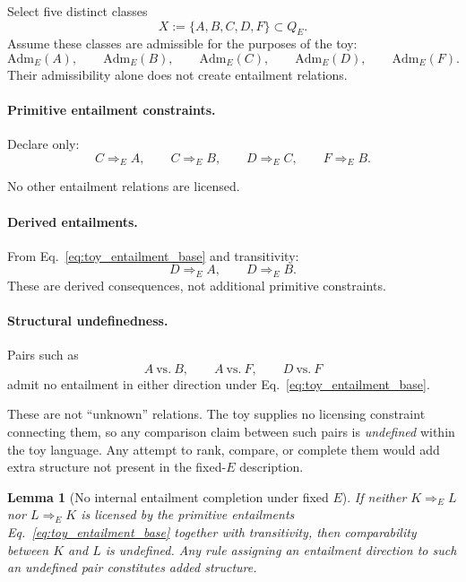 \documentclass[aps,prx,onecolumn,11pt]{revtex4-2}
\theoremstyle{plain}
\newtheorem{lemma}{Lemma}
\theoremstyle{definition}
\theoremstyle{remark}
\begin{document}
Select five distinct classes
\[
X:=\{A,B,C,D,F\}\subset Q_E.
\]
Assume these classes are admissible for the purposes of the toy:
\[
\mathrm{Adm}_E(A),
\qquad
\mathrm{Adm}_E(B),
\qquad
\mathrm{Adm}_E(C),
\qquad
\mathrm{Adm}_E(D),
\qquad
\mathrm{Adm}_E(F).
\]
Their admissibility alone does not create entailment relations.

\paragraph{Primitive entailment constraints.}

Declare only:
\begin{equation}
C\Rightarrow_E A,
\qquad
C\Rightarrow_E B,
\qquad
D\Rightarrow_E C,
\qquad
F\Rightarrow_E B.
\label{eq:toy_entailment_base}
\end{equation}

No other entailment relations are licensed.

\paragraph{Derived entailments.}

From Eq.~\eqref{eq:toy_entailment_base} and transitivity:
\[
D\Rightarrow_E A,
\qquad
D\Rightarrow_E B.
\]
These are derived consequences, not additional primitive constraints.

\paragraph{Structural undefinedness.}

Pairs such as
\[
A\ \text{vs.}\ B,
\qquad
A\ \text{vs.}\ F,
\qquad
D\ \text{vs.}\ F
\]
admit no entailment in either direction under
Eq.~\eqref{eq:toy_entailment_base}.

These are not ``unknown'' relations. The toy supplies no licensing
constraint connecting them, so any comparison claim between such pairs
is \emph{undefined} within the toy language. Any attempt to rank,
compare, or complete them would add extra structure not present in the
fixed-\(E\) description.

\begin{lemma}[No internal entailment completion under fixed \(E\)]
\label{lem:toy_no_completion_entailment}
If neither \(K\Rightarrow_E L\) nor \(L\Rightarrow_E K\) is licensed by
the primitive entailments Eq.~\eqref{eq:toy_entailment_base} together
with transitivity, then comparability between \(K\) and \(L\) is
undefined. Any rule assigning an entailment direction to such an
undefined pair constitutes added structure.
\end{lemma}
\end{document}
